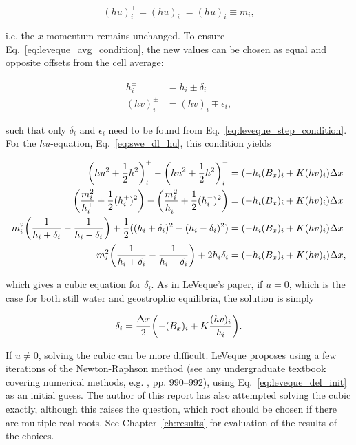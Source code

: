 \begin{equation}
  (hu)_i^+ = (hu)_i^- = (hu)_i \equiv m_i,
\end{equation}

i.e. the $x$-momentum remains unchanged. To ensure Eq.~\ref{eq:leveque_avg_condition}, the new values can be chosen as equal and opposite offsets from the cell average:

\begin{align}
  h_i^\pm &= h_i \pm \delta_i \\
  (hv)_i^\pm &= (hv)_i \mp \epsilon_i,
\end{align}

such that only $\delta_i$ and $\epsilon_i$ need to be found from Eq.~\ref{eq:leveque_step_condition}. For the $hu$-equation, Eq.~\ref{eq:swe_dl_hu}, this condition yields

\begin{align}
  \qty(hu^2 + \frac{1}{2}h^2)_i^+ - \qty(hu^2 + \frac{1}{2}h^2)_i^- &= (- h_i (B_x)_i + K (hv)_i)\Delta x \\
  \qty(\frac{m_i^2}{h_i^+} + \frac{1}{2}(h_i^+)^2) - \qty(\frac{m_i^2}{h_i^-} + \frac{1}{2}(h_i^-)^2) &= (- h_i (B_x)_i + K (hv)_i)\Delta x \\
  m_i^2\qty(\frac{1}{h_i+\delta_i} - \frac{1}{h_i-\delta_i}) + \frac{1}{2} ((h_i+\delta_i)^2 - (h_i-\delta_i)^2) &= (- h_i (B_x)_i + K (hv)_i)\Delta x \\
  m_i^2\qty(\frac{1}{h_i+\delta_i} - \frac{1}{h_i-\delta_i}) + 2 h_i \delta_i &= (- h_i (B_x)_i + K (hv)_i)\Delta x,
\end{align}

which gives a cubic equation for $\delta_i$. As in LeVeque's paper, if $u = 0$, which is the case for both still water and geostrophic equilibria, the solution is simply

\begin{equation}
  \label{eq:leveque_del_init}
  \delta_i = \frac{\Delta x}{2} \qty(-(B_x)_i + K\frac{(hv)_i}{h_i}).
\end{equation}

If $u \neq 0$, solving the cubic can be more difficult. LeVeque proposes using a few iterations of the Newton-Raphson method (see any undergraduate textbook covering numerical methods, e.g. \citet{riley2006mathematical}, pp. 990--992), using Eq.~\ref{eq:leveque_del_init} as an initial guess. The author of this report has also attempted solving the cubic exactly, although this raises the question, which root should be chosen if there are multiple real roots. See Chapter~\ref{ch:results} for evaluation of the results of the choices.

